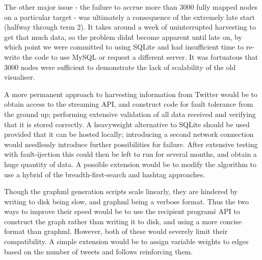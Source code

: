 The other major issue - the failure to accrue more than 3000 fully mapped nodes on a particular target - was ultimately a consequence of the extremely late start (halfway through term 2). It takes around a week of uninterrupted harvesting to get that much data, so the problem didn\'t become apparent until late on, by which point we were committed to using SQLite and had insufficient time to re-write the code to use MySQL or request a different server. It was fortuatous that 3000 nodes were sufficient to demonstrate the lack of scalability of the old visualiser.

A more permanent approach to harvesting information from Twitter would be to obtain access to the streaming API, and construct code for fault tolerance from the ground up; performing extensive validation of all data received and verifying that it is stored correctly. A heavyweight alternative to SQLite should be used provided that it can be hosted locally; introducing a second network connection would needlessly introduce further possibilities for failure. After extensive testing with fault-ijection this could then be left to run for several months, and obtain a huge quantity of data. A possible extension would be to modify the algorithm to use a hybrid of the breadth-first-search and hashtag approaches.

Though the graphml generation scripts scale linearly, they are hindered by writing to disk being slow, and graphml being a verbose format. Thus the two ways to improve their speed would be to use the recipient program\'s API to construct the graph rather than writing it to disk, and using a more concise format than graphml. However, both of these would severely limit their compatibility. A simple extension would be to assign variable weights to edges based on the number of tweets and follows reinforcing them.